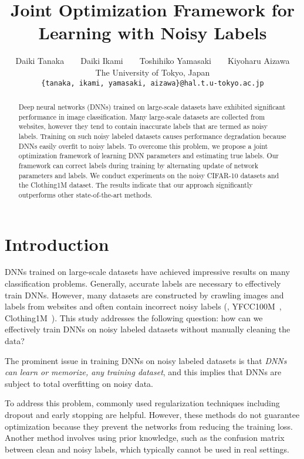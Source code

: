 \documentclass[10pt,twocolumn,letterpaper]{article}
\begin{document}
\title{Joint Optimization Framework for Learning with Noisy Labels}

\author{Daiki Tanaka\ \ \ \ Daiki Ikami\ \ \ \ Toshihiko Yamasaki\ \ \ \ Kiyoharu Aizawa\\
The University of Tokyo, Japan\\
{\tt\small \{tanaka, ikami, yamasaki, aizawa\}@hal.t.u-tokyo.ac.jp}
}


\maketitle


\begin{abstract}
  Deep neural networks (DNNs) trained on large-scale datasets have exhibited significant performance in image classification. Many large-scale datasets are collected from websites, however they tend to contain inaccurate labels that are termed as noisy labels. Training on such noisy labeled datasets causes performance degradation because DNNs easily overfit to noisy labels. To overcome this problem, we propose a joint optimization framework of learning DNN parameters and estimating true labels. Our framework can correct labels during training by alternating update of network parameters and labels. We conduct experiments on the noisy CIFAR-10 datasets and the Clothing1M dataset. The results indicate that our approach significantly outperforms other state-of-the-art methods.
\end{abstract}

\section{Introduction}\label{sec:intro}
DNNs trained on large-scale datasets have achieved impressive results on many classification problems. Generally, accurate labels are necessary to effectively train DNNs. However, many datasets are constructed by crawling images and labels from websites and often contain incorrect noisy labels (\eg, YFCC100M~\cite{thomee2015new}, Clothing1M~\cite{xiao2015learning}). This study addresses the following question: how can we effectively train DNNs on noisy labeled datasets without manually cleaning the data?

The prominent issue in training DNNs on noisy labeled datasets is that \textit{DNNs can learn or memorize, any training dataset}, and this implies that DNNs are subject to total overfitting on noisy data.

To address this problem, commonly used regularization techniques including dropout and early stopping are helpful. However, these methods do not guarantee optimization because they prevent the networks from reducing the training loss. Another method involves using prior knowledge, such as the confusion matrix between clean and noisy labels, which typically cannot be used in real settings.
\end{document}
